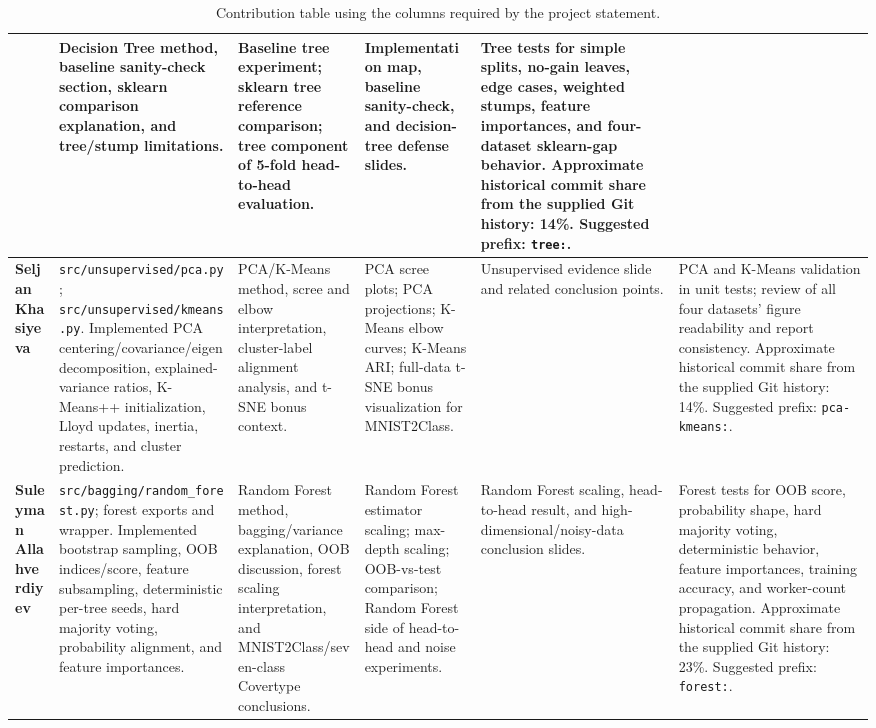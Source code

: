 \documentclass[10pt,a4paper,landscape]{article}
\begin{document}
\begin{table}[h]
\begin{tabularx}{\textwidth}{@{}p{2.55cm}YYYYY@{}}
&
Decision Tree method, baseline sanity-check section, sklearn comparison explanation, and tree/stump limitations.
&
Baseline tree experiment; sklearn tree reference comparison; tree component of 5-fold head-to-head evaluation.
&
Implementation map, baseline sanity-check, and decision-tree defense slides.
&
Tree tests for simple splits, no-gain leaves, edge cases, weighted stumps, feature importances, and four-dataset sklearn-gap behavior. Approximate historical commit share from the supplied Git history: 14\%. Suggested prefix: \texttt{tree:}.
\\
\midrule
\textbf{Seljan Khasiyeva}
&
\texttt{src/unsupervised/pca.py}; \texttt{src/unsupervised/kmeans.py}. Implemented PCA centering/covariance/eigendecomposition, explained-variance ratios, K-Means++ initialization, Lloyd updates, inertia, restarts, and cluster prediction.
&
PCA/K-Means method, scree and elbow interpretation, cluster-label alignment analysis, and t-SNE bonus context.
&
PCA scree plots; PCA projections; K-Means elbow curves; K-Means ARI; full-data t-SNE bonus visualization for MNIST2Class.
&
Unsupervised evidence slide and related conclusion points.
&
PCA and K-Means validation in unit tests; review of all four datasets' figure readability and report consistency. Approximate historical commit share from the supplied Git history: 14\%. Suggested prefix: \texttt{pca-kmeans:}.
\\
\midrule
\textbf{Suleyman Allahverdiyev}
&
\texttt{src/bagging/random\_forest.py}; forest exports and wrapper. Implemented bootstrap sampling, OOB indices/score, feature subsampling, deterministic per-tree seeds, hard majority voting, probability alignment, and feature importances.
&
Random Forest method, bagging/variance explanation, OOB discussion, forest scaling interpretation, and MNIST2Class/seven-class Covertype conclusions.
&
Random Forest estimator scaling; max-depth scaling; OOB-vs-test comparison; Random Forest side of head-to-head and noise experiments.
&
Random Forest scaling, head-to-head result, and high-dimensional/noisy-data conclusion slides.
&
Forest tests for OOB score, probability shape, hard majority voting, deterministic behavior, feature importances, training accuracy, and worker-count propagation. Approximate historical commit share from the supplied Git history: 23\%. Suggested prefix: \texttt{forest:}.
\\
\bottomrule
\end{tabularx}
\caption{Contribution table using the columns required by the project statement.}
\end{table}
\clearpage
\end{document}
